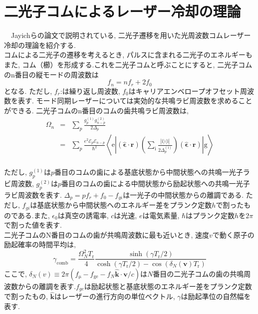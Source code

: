 \documentclass[uplatex, dvipdfmx, a4paper, report, papersize, 11pt]{jsbook}
\begin{document}
\section{二光子コムによるレーザー冷却の理論}
　Jayichらの論文\cite{PhysRevX.6.041004}で説明されている, 二光子遷移を用いた光周波数コムレーザー冷却の理論を紹介する.\\
コムによる二光子の遷移を考えるとき, パルスに含まれる二光子のエネルギーもまた, コム（櫛）を形成する.これを二光子コムと呼ぶことにすると, 二光子コムのn番目の縦モードの周波数は
\begin{equation}
f_n = nf_r + 2f_0
\end{equation}
となる. ただし, $f_r$:は繰り返し周波数, $f_0$はキャリアエンベロープオフセット周波数を表す. モード同期レーザーについては実効的な共鳴ラビ周波数を求めることができる. 二光子コムのn番目のコムの歯共鳴ラビ周波数は,
\begin{eqnarray}\label{ResonanceRabi}
\Omega _{n} &=&\sum _{p}\frac {g^{\left( 1\right) }_{p}g^{\left( 2\right) }_{n-p}}{2\Delta_p} \nonumber\\
&=& \sum _ { p } \frac { e ^ { 2 } \mathcal { E } _ { p } \mathcal { E } _ { n - p } } { \hbar ^ { 2 } } \left\langle \mathrm { e } \left| ( \hat { \boldsymbol { \epsilon } } \cdot \mathbf { r } ) \left( \sum _ { \mathrm { i } } \frac { | \mathrm { i } \rangle \langle \mathrm { i } | } { 2 \Delta _ { p } ^ { ( \mathrm { i } ) } } \right) ( \hat { \boldsymbol { \epsilon } } \cdot \mathbf { r } ) \right| \mathrm { g } \right\rangle
\end{eqnarray}\\
ただし, $g^{\left( 1\right) }_{p}$は$p$番目のコムの歯による基底状態から中間状態への共鳴一光子ラビ周波数, $g^{\left( 2\right) }_{p}$は$p$番目のコムの歯による中間状態から励起状態への共鳴一光子ラビ周波数を表す.
$\Delta _{p}=pf_{r}+f_{0}-f_{gi}$は一光子の中間状態からの離調である. ただし, $f_{gi}$は基底状態から中間状態へのエネルギー差をプランク定数$h$で割ったものである.また, $\epsilon_0$は真空の誘電率, $c$は光速, $e$は電気素量, $\hbar$はプランク定数$h$を$2\pi$で割った値を表す. \\
二光子コムのN番目のコムの歯が共鳴周波数に最も近いとき, 速度$v$で動く原子の励起確率の時間平均は,
\begin{equation}\label{ExcitationRate}
\gamma_\mathrm{comb} = \frac{\Omega^2_{N}T_\mathrm{r}} {4} \frac{\sinh(\gamma T_\mathrm{r}/2)}{\cosh(\gamma T_\mathrm{r}/2) - \cos(\delta_N(\bm{v})T_\mathrm{r})}
\end{equation}
ここで, $\delta _{N}\left( v\right) \equiv 2\pi ( f_\mathrm{\mu }-f_\mathrm{ge}-f_{N}\widehat {\bm{k}}\cdot {\bm{v}}/c )$は$N$番目の二光子コムの歯の共鳴周波数からの離調を表す.$f_{ge}$は励起状態と基底状態のエネルギー差をプランク定数で割ったもの, $\widehat {\bm{k}}$はレーザーの進行方向の単位ベクトル, $\gamma$は励起準位の自然幅を表す.\\
\end{document}

